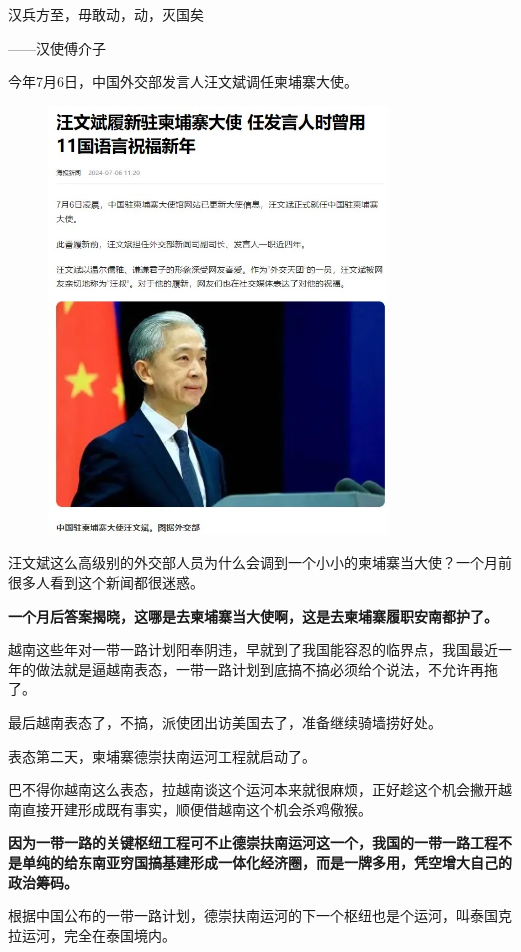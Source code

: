 \documentclass[UTF8, 11pt, oneside]{ctexart}
\newcommand{\zd}[1]{\textbf{\textcolor[RGB]{123,12,0}{#1}}} %
\newcommand{\yh}[1]{%
    \begin{tcolorbox}[enhanced,
        frame hidden, interior hidden,
        before skip = 5mm, left skip=10mm,
        borderline west={5pt}{0pt}{gray!50}]
        #1
    \end{tcolorbox}
}
\begin{document}
\yh{
    汉兵方至，毋敢动，动，灭国矣
    \begin{flushright} ——汉使傅介子 \end{flushright}
}

今年7月6日，中国外交部发言人汪文斌调任柬埔寨大使。

\begin{figure}[H]
    \centering
    \includegraphics[width=9cm]{2024-08-17-006.jpg}
\end{figure}

汪文斌这么高级别的外交部人员为什么会调到一个小小的柬埔寨当大使？一个月前很多人看到这个新闻都很迷惑。

\zd{一个月后答案揭晓，这哪是去柬埔寨当大使啊，这是去柬埔寨履职安南都护了。}

越南这些年对一带一路计划阳奉阴违，早就到了我国能容忍的临界点，我国最近一年的做法就是逼越南表态，一带一路计划到底搞不搞必须给个说法，不允许再拖了。

最后越南表态了，不搞，派使团出访美国去了，准备继续骑墙捞好处。

表态第二天，柬埔寨德崇扶南运河工程就启动了。

巴不得你越南这么表态，拉越南谈这个运河本来就很麻烦，正好趁这个机会撇开越南直接开建形成既有事实，顺便借越南这个机会杀鸡儆猴。

\zd{因为一带一路的关键枢纽工程可不止德崇扶南运河这一个，我国的一带一路工程不是单纯的给东南亚穷国搞基建形成一体化经济圈，而是一牌多用，凭空增大自己的政治筹码。}

根据中国公布的一带一路计划，德崇扶南运河的下一个枢纽也是个运河，叫泰国克拉运河，完全在泰国境内。
\end{document}
